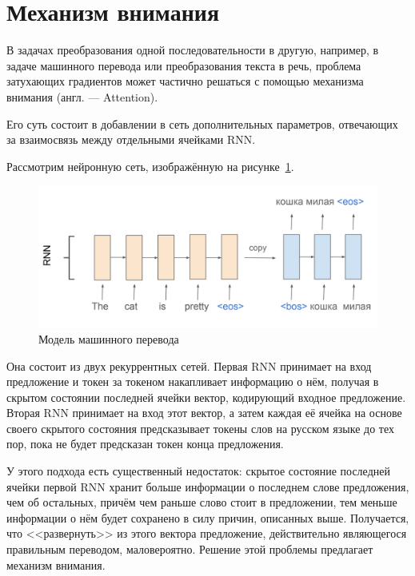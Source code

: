 \section{Механизм внимания}

В задачах преобразования одной последовательности в другую, например, в задаче машинного перевода или преобразования текста в речь, проблема затухающих градиентов может частично решаться с помощью механизма внимания (англ. --- Attention).

Его суть состоит в добавлении в сеть дополнительных параметров, отвечающих за взаимосвязь между отдельными ячейками RNN.

Рассмотрим нейронную сеть, изображённую на рисунке \ref*{fig:seq2seq}.

\begin{figure}[h]
    \centering
    \includegraphics[width=\textwidth]{../inc/images/seq2seq.png}
    \caption{Модель машинного перевода}
    \label{fig:seq2seq}
\end{figure}

Она состоит из двух рекуррентных сетей. Первая RNN принимает на вход предложение и токен за токеном накапливает информацию о нём, получая в скрытом состоянии последней ячейки вектор, кодирующий входное предложение. Вторая RNN принимает на вход этот вектор, а затем каждая её ячейка на основе своего скрытого состояния предсказывает токены слов на русском языке до тех пор, пока не будет предсказан токен конца предложения.

У этого подхода есть существенный недостаток: скрытое состояние последней ячейки первой RNN хранит больше информации о последнем слове предложения, чем об остальных, причём чем раньше слово стоит в предложении, тем меньше информации о нём будет сохранено в силу причин, описанных выше. Получается, что <<развернуть>> из этого вектора предложение, действительно являющегося правильным переводом, маловероятно. Решение этой проблемы предлагает механизм внимания.

